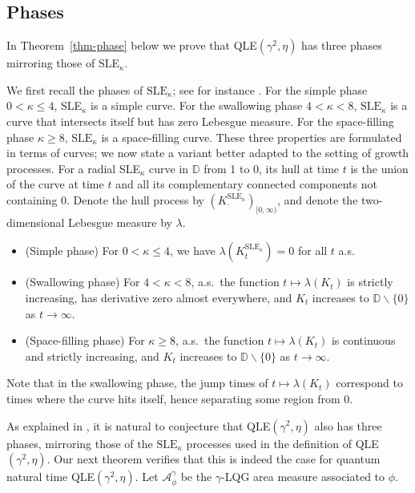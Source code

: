 \documentclass[a4paper]{article}
\numberwithin{equation}{section}
\newcommand{\D}{\mathbb{D}}
\newcommand{\cA}{\mathcal{A}}
\newcommand{\SLE}{\mathrm{SLE}}
\theoremstyle{remark}
\numberwithin{equation}{section}
\begin{document}
\subsection{Phases}\label{subsec-intro-phases}
In Theorem~\ref{thm-phase} below we prove that QLE$(\gamma^2, \eta)$ has three phases mirroring those of SLE$_\kappa$. 

We first recall the phases of $\SLE_\kappa$; see for instance \cite{lawler2008conformally, rohde-schramm-basic-sle}. For the simple phase $0 < \kappa \leq 4$,  SLE$_\kappa$ is a simple curve. For the swallowing phase $4 < \kappa < 8$, $\SLE_\kappa$ is a curve that intersects itself but has zero Lebesgue measure. For the space-filling phase $\kappa \geq 8$, $\SLE_\kappa$ is  a space-filling curve. 
These three properties are formulated in terms of curves; we now state a variant better adapted to the setting of growth processes. For a radial SLE$_\kappa$ curve in $\D$ from 1 to 0, its hull at time $t$ is the union of the curve at time $t$ and all its complementary connected components not containing 0. Denote the hull process by $(K^{\mathrm{SLE}_\kappa}_\cdot)_{[0,\infty)}$, and denote the two-dimensional Lebesgue measure by $\lambda$.
\begin{itemize}
    \item (Simple phase) For $0 < \kappa \leq 4$, we have $\lambda(K^{\mathrm{SLE}_\kappa}_t) = 0$  for all $t$ a.s. 
    \item (Swallowing phase) For $4 < \kappa < 8$, a.s.\ the function $t \mapsto \lambda(K_t)$ is strictly increasing, has derivative zero almost everywhere, and $K_t$ increases to $\D \backslash \{0\}$ as $t \to \infty$. 
    \item (Space-filling phase) For $\kappa \geq 8$, a.s.\ the function $t \mapsto \lambda(K_t)$ is continuous and strictly increasing, and $K_t$ increases to $\D \backslash \{0\}$ as $t \to \infty$.
\end{itemize}
Note that in the swallowing phase, the jump times of $t \mapsto \lambda(K_t)$ correspond to times where the curve hits itself, hence separating some region from 0. 


As explained in \cite[Section 8.2]{ms-qle}, it is natural to conjecture that  QLE$(\gamma^2, \eta)$ also has three phases, mirroring those of the $\SLE_\kappa$ processes used in the definition of QLE$(\gamma^2, \eta)$. Our next theorem verifies that this is indeed the case for quantum natural time QLE$(\gamma^2, \eta)$. Let $\cA^\gamma_\phi$ be the $\gamma$-LQG area measure associated to $\phi$. 
\end{document}
